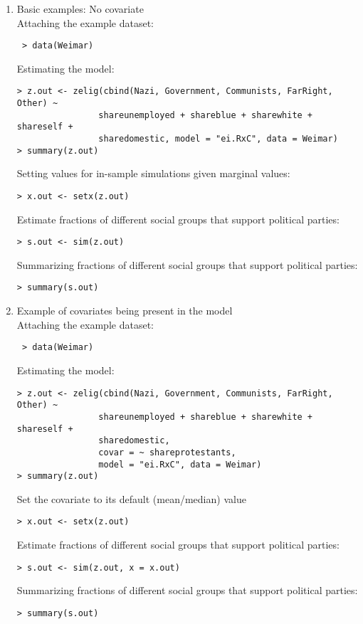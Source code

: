 \begin{enumerate}
 \item Basic examples: No covariate \\
 Attaching the example dataset:
 \begin{verbatim} 
 > data(Weimar)
 \end{verbatim}
Estimating the model:
\begin{verbatim}
> z.out <- zelig(cbind(Nazi, Government, Communists, FarRight, Other) ~  
                shareunemployed + shareblue + sharewhite + shareself + 
                sharedomestic, model = "ei.RxC", data = Weimar)
> summary(z.out)
\end{verbatim}

Setting values for in-sample simulations given marginal values:
\begin{verbatim}
> x.out <- setx(z.out)
\end{verbatim}

Estimate fractions of different social groups that support political parties:
\begin{verbatim}
> s.out <- sim(z.out)
\end{verbatim}

Summarizing fractions of different social groups that support political parties:
\begin{verbatim}
> summary(s.out)
\end{verbatim}

 \item Example of covariates being present in the model \\
 Attaching the example dataset:
 \begin{verbatim} 
 > data(Weimar)
 \end{verbatim}
Estimating the model:
\begin{verbatim}
> z.out <- zelig(cbind(Nazi, Government, Communists, FarRight, Other) ~  
                shareunemployed + shareblue + sharewhite + shareself + 
                sharedomestic,
                covar = ~ shareprotestants, 
                model = "ei.RxC", data = Weimar)
> summary(z.out)
\end{verbatim}

Set the covariate to its default (mean/median) value
\begin{verbatim}
> x.out <- setx(z.out)
\end{verbatim}

Estimate fractions of different social groups that support political parties:
\begin{verbatim}
> s.out <- sim(z.out, x = x.out)
\end{verbatim}

Summarizing fractions of different social groups that support political parties:
\begin{verbatim}
> summary(s.out)
\end{verbatim}
\end{enumerate}

